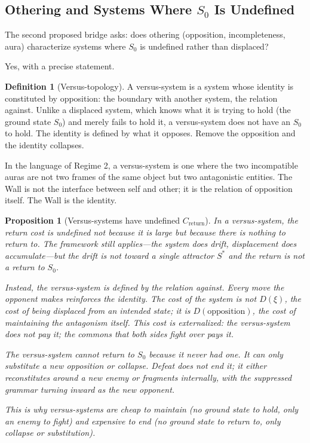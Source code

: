 \documentclass[12pt]{article}
\newtheorem{proposition}[theorem]{Proposition}
\theoremstyle{definition}
\newtheorem{definition}[theorem]{Definition}
\theoremstyle{remark}
\begin{document}
\subsection{Othering and Systems Where $S_0$ Is Undefined}

The second proposed bridge asks: does othering (opposition, incompleteness, aura) characterize systems where $S_0$ is undefined rather than displaced?

Yes, with a precise statement.

\begin{definition}[Versus-topology]
A versus-system is a system whose identity is constituted by opposition: the boundary with another system, the relation against. Unlike a displaced system, which knows what it is trying to hold (the ground state $S_0$) and merely fails to hold it, a versus-system does not have an $S_0$ to hold. The identity is defined by what it opposes. Remove the opposition and the identity collapses.

In the language of Regime 2, a versus-system is one where the two incompatible auras are not two frames of the same object but two antagonistic entities. The Wall is not the interface between self and other; it is the relation of opposition itself. The Wall is the identity.
\end{definition}

\begin{proposition}[Versus-systems have undefined $C_{\text{return}}$]
In a versus-system, the return cost is undefined not because it is large but because there is nothing to return to. The framework still applies---the system does drift, displacement does accumulate---but the drift is not toward a single attractor $S^*$ and the return is not a return to $S_0$.

Instead, the versus-system is defined by the relation against. Every move the opponent makes reinforces the identity. The cost of the system is not $D(\xi)$, the cost of being displaced from an intended state; it is $D(\text{opposition})$, the cost of maintaining the antagonism itself. This cost is externalized: the versus-system does not pay it; the commons that both sides fight over pays it.

The versus-system cannot return to $S_0$ because it never had one. It can only substitute a new opposition or collapse. Defeat does not end it; it either reconstitutes around a new enemy or fragments internally, with the suppressed grammar turning inward as the new opponent.

This is why versus-systems are cheap to maintain (no ground state to hold, only an enemy to fight) and expensive to end (no ground state to return to, only collapse or substitution).
\end{proposition}
\end{document}
